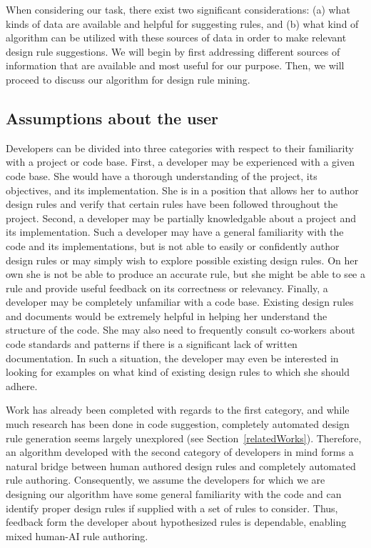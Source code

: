 \documentclass[12pt]{article}
\begin{document}
When considering our task, there exist two significant considerations: (a) what kinds of data are available and helpful for suggesting rules, and (b) what kind of algorithm can be utilized with these sources of data in order to make relevant design rule suggestions. We will begin by first addressing different sources of information that are available and most useful for our purpose. Then, we will proceed to discuss our algorithm for design rule mining.


\subsection{Assumptions about the user} \label{assumptions}

Developers can be divided into three categories with respect to their familiarity with a project or code base. First, a developer may be experienced with a given code base. She would have a thorough understanding of the project, its objectives, and its implementation. She is in a position that allows her to author design rules and verify that certain rules have been followed throughout the project. Second, a developer may be partially knowledgable about a project and its implementation. Such a developer may have a general familiarity with the code and its implementations, but is not able to easily or confidently author design rules or may simply wish to explore possible existing design rules. On her own she is not be able to produce an accurate rule, but she might be able to see a rule and provide useful feedback on its correctness or relevancy. Finally, a developer may be completely unfamiliar with a code base. Existing design rules and documents would be extremely helpful in helping her understand the structure of the code. She may also need to frequently consult co-workers about code standards and patterns if there is a significant lack of written documentation. In such a situation, the developer may even be interested in looking for examples on what kind of existing design rules to which she should adhere.

 Work has already been completed with regards to the first category, and while much research has been done in code suggestion, completely automated design rule generation seems largely unexplored (see Section~\ref{relatedWorks}). Therefore, an algorithm developed with the second category of developers in mind forms a natural bridge between human authored design rules and completely automated rule authoring. Consequently, we assume the developers for which we are designing our algorithm have some general familiarity with the code and can identify proper design rules if supplied with a set of rules to consider. Thus, feedback form the developer about hypothesized rules is dependable, enabling mixed human-AI rule authoring.
\end{document}
